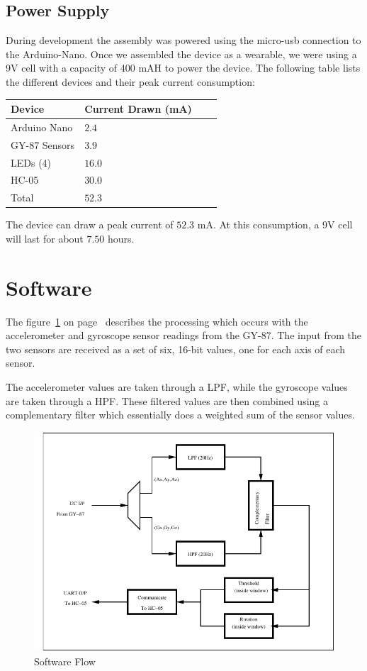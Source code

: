 \documentclass[11pt, a4paper]{article}
\begin{document}
\subsection{Power Supply}
During development the assembly was powered using the micro-usb connection to
the Arduino-Nano. Once we assembled the device as a wearable, we were using a
9V cell with a capacity of 400 mAH to power the device. The following table
lists the different devices and their peak current consumption:

\begin{center}
   \begin{tabular}{llll}
      \hline
      Device & Current Drawn (mA) \\
      \hline
      Arduino Nano & $2.4$ \\
      GY-87 Sensors & $3.9$ \\
      LEDs (4) & $16.0$ & \\
      HC-05 & $30.0$ \\
      \hline
      Total & $52.3$ \\
      \hline
   \end{tabular}
\end{center}

\noindent The device can draw a peak current of $52.3$ mA. At this
consumption, a 9V cell will last for about $7.50$ hours.

\section{Software}
The figure~\ref{fig:sw_flow} on page~\pageref{fig:sw_flow} describes the
processing which occurs with the accelerometer and gyroscope sensor readings
from the GY-87. The input from the two sensors are received as a set of six,
16-bit values, one for each axis of each sensor. 

\noindent The accelerometer values are taken through a LPF, while the
gyroscope values are taken through a HPF. These filtered values are then
combined using a complementary filter which essentially does a weighted sum of
the sensor values.

\begin{figure}[htb]
    \centering
    \includegraphics[width=\linewidth]{SW_Flow.pdf}
    \caption{Software Flow}
    \label{fig:sw_flow}
\end{figure}
\end{document}
